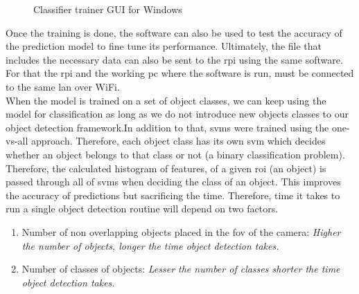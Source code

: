 \documentclass[a4paper,12pt]{report}%
\begin{document}
\begin{figure}[H]
	\centering
	\caption{Classifier trainer GUI for Windows}
	\label{fig:classtrainer}
\end{figure}

Once the training is done, the software can also be used to test the accuracy of the prediction model to fine tune its performance. Ultimately, the file that includes the necessary data can also be sent to the \ac{rpi} using the same software. For that the \ac{rpi} and the working \ac{pc} where the software is run,  must be connected to the same \ac{lan} over WiFi.\\

When the model is trained on a set of object classes, we can keep using the model for classification as long as we do not introduce new objects classes to our object detection framework.In addition to that, \ac{svm}s were trained using the one-vs-all approach. Therefore, each object class has its own \ac{svm} which decides whether an object belongs to that class or not (a binary classification problem). Therefore, the calculated histogram of features, of a given \ac{roi} (an object) is passed through all of \ac{svm}s when deciding the class of an object. This improves the accuracy of predictions but sacrificing the time. Therefore, time it takes to run a single object detection routine will depend on two factors.

\begin{enumerate}
	\item Number of non overlapping objects placed in the \ac{fov} of the camera: \textit{Higher the number of objects, longer the time object detection takes.}
	
	\item Number of classes of objects: \textit{Lesser the number of classes  shorter the time object detection takes.}
\end{enumerate}
\end{document}
